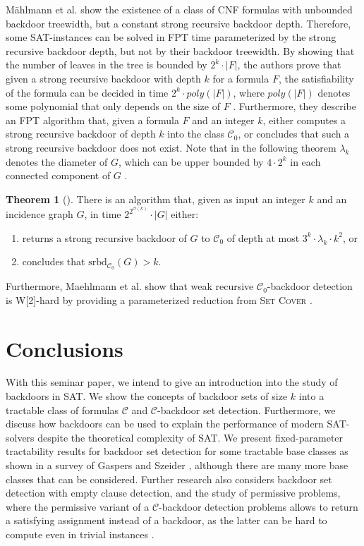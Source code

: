 \documentclass[11pt,a4paper]{article}
\theoremstyle{definition}
\theoremstyle{proposition}
\newtheorem{theorem}{Theorem}[section]
\begin{document}
Mählmann et al. show the existence of a class of CNF formulas with unbounded backdoor treewidth, but a constant strong recursive backdoor depth. Therefore, some SAT-instances can be solved in FPT time parameterized by the strong recursive backdoor depth, but not by their backdoor treewidth. By showing that the number of leaves in the tree is bounded by $2^k \cdot |F|$, the authors prove that given a strong recursive backdoor with depth $k$ for a formula $F$, the satisfiability of the formula can be decided in time $2^k \cdot poly(|F|)$, where $poly(|F|)$ denotes some polynomial that only depends on the size of $F$ \cite[p.6]{maehlmann2021recursive}. Furthermore, they describe an FPT algorithm that, given a formula $F$ and an integer $k$, either computes a strong recursive backdoor of depth $k$ into the class $\mathcal{C}_0$, or concludes that such a strong recursive backdoor does not exist. Note that in the following theorem $\lambda_k$ denotes the diameter of $G$, which can be upper bounded by $4 \cdot 2^k$ in each connected component of $G$ \cite[Lemma 5.2, p.8]{maehlmann2021recursive}. 
\begin{theorem}[{\cite[Theorem 4.5, p.10]{maehlmann2021recursive}}]
There is an algorithm that, given as input an integer $k$ and an incidence graph $G$, in time $2^{2^{\mathcal{O}(k)}} \cdot |G|$ either: 
\begin{enumerate}
\item returns a strong recursive backdoor of $G$ to $\mathcal{C}_{0}$ of depth at most $3^k \cdot \lambda_k \cdot k^2$, or
\item concludes that $\text{srbd}_{\mathcal{C}_0}(G) > k$.
\end{enumerate}
\end{theorem}
Furthermore, Maehlmann et al. show that weak recursive $\mathcal{C}_0$-backdoor detection is W[2]-hard by providing a parameterized reduction from \textsc{Set Cover} \cite[p.12]{maehlmann2021recursive}.  

\section{Conclusions}
\label{sec:conclusions}
With this seminar paper, we intend to give an introduction into the study of backdoors in SAT. We show the concepts of backdoor sets of size $k$ into a tractable class of formulas $\mathcal{C}$ and $\mathcal{C}$-backdoor set detection. Furthermore, we discuss how backdoors can be used to explain the performance of modern SAT-solvers despite the theoretical complexity of SAT. We present fixed-parameter tractability results for backdoor set detection for some tractable base classes as shown in a survey of Gaspers and Szeider \cite{Gaspers2012}, although there are many more base classes that can be considered. Further research also considers backdoor set detection with empty clause detection, and the study of permissive problems, where the permissive variant of a $\mathcal{C}$-backdoor detection problems allows to return a satisfying assignment instead of a backdoor, as the latter can be hard to compute even in trivial instances \cite[p.301]{Gaspers2012}. 
\end{document}
